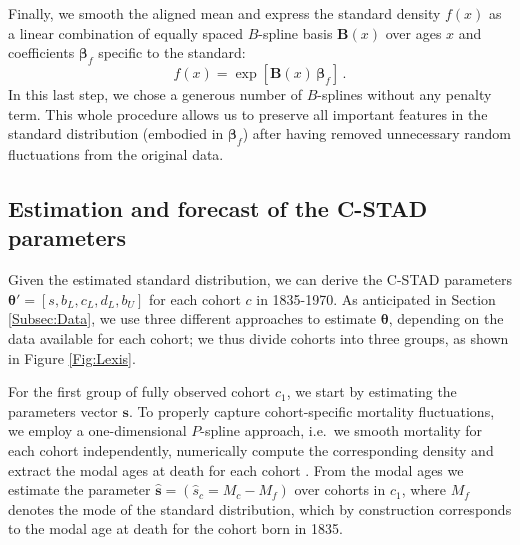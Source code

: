 \documentclass[11pt, a4paper]{article}
\begin{document}
Finally, we smooth the aligned mean and express the standard density $f(x)$ as a linear combination of equally spaced $B$-spline basis $\bm{B}(x)$ over ages $x$ and coefficients $\bm{\beta}_{f}$ specific to the standard:
%
\begin{equation}\label{Eq:standPsplines}
f(x) = \exp\left[ \bm{B}(x) \, \bm{\beta}_{f} \right] \, .
\end{equation}
In this last step, we chose a generous number of $B$-splines without any penalty term. This whole procedure allows us to preserve all important features in the standard distribution (embodied in $\bm{\beta}_{f}$) after having removed unnecessary random fluctuations from the original data.


\subsection{Estimation and forecast of the C-STAD parameters}
\label{Subsec:EstimForeC-STAD}
Given the estimated standard distribution, we can derive the C-STAD parameters $\bm{\theta}'=\left[s,b_{L},c_{L},d_{L},b_{U}\right]$ for each cohort $c$ in 1835-1970. As anticipated in Section \ref{Subsec:Data}, we use three different approaches to estimate $\bm{\theta}$, depending on the data available for each cohort; we thus divide cohorts into three groups, as shown in Figure \ref{Fig:Lexis}. 

For the first group of fully observed cohort $c_1$, we start by estimating the parameters vector $\bm{s}$. To properly capture cohort-specific mortality fluctuations, we employ a one-dimensional $P$-spline approach, i.e.~we smooth mortality for each cohort independently, numerically compute the corresponding density and extract the modal ages at death for each cohort \citep[for a similar approach in a period perspective see][]{ouellette2011changes}. From the modal ages we estimate the parameter $\hat{\bm{s}}=\left(\hat{s}_{c}=M_{c} - M_f\right)$ over cohorts in $c_1$, where $M_f$ denotes the mode of the standard distribution, which by construction corresponds to the modal age at death for the cohort born in 1835. \par
\end{document}
